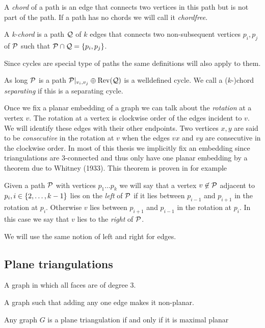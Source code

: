  A \emph{chord} of a path is an edge that connects two vertices in this path but is not part of the path. If a path has no chords we will call it \emph{chordfree}.

  A \emph{k-chord} is a path $\Q$ of $k$ edges that connects two non-subsequent vertices $p_i, p_j$ of $\P$ such that $\P \cap \Q = \braces{p_i, p_j}$.

  Since cycles are special type of paths the same definitions will also apply to them.

  As long $\P$ is a path $\P|_{v_i, v_j} \oplus \rev(\Q)$ is a welldefined cycle. We call a ($k$-)chord \emph{separating} if this is a separating cycle.

  Once we fix a planar embedding of a graph we can talk about the \emph{rotation} at a vertex $v$. The rotation at a vertex is clockwise order of the edges incident to $v$. We will identify these edges with their other endpoints. Two vertices $x, y$ are said to be \emph{consecutive} in the rotation at $v$ when the edges $vx$ and $vy$ are consecutive in the clockwise order. In most of this thesis we implicitly fix an embedding since triangulations are 3-connected and thus only have one planar embedding by a theorem due to Whitney (1933). This theorem is proven in for example \cite[p. 267]{Bondy2008}

  Given a path $\P$ with vertices $p_1 \ldots p_k$ we will say that a vertex $v \nin \P$ adjacent to $p_i, i \in \braces{2, \ldots, k-1}$ lies on the \emph{left} of $\P$ if it lies between $p_{i-1}$ and $p_{i+1}$ in the rotation at $p_{i}$. Otherwise $v$ lies between $p_{i+1}$ and $p_{i-1}$ in the
  rotation at $p_i$. In this case we say that $v$ lies to the \emph{right} of $\P$.

  We will use the same notion of left and right for edges.

\subsection{Plane triangulations}

\begin{defi} 
A graph in which all faces are of degree $3$.
\end{defi}

\begin{defi} 
A graph such that adding any one edge makes it non-planar.
\end{defi}

\begin{thrm}
Any graph $G$ is a plane triangulation if and only if it is maximal planar
\end{thrm}

